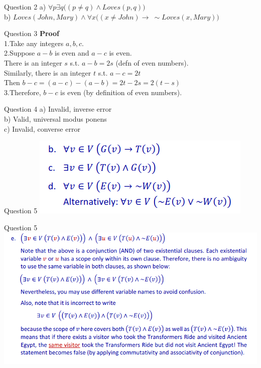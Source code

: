 \documentclass[10pt]{beamer}
\begin{document}
\begin{frame}[fragile]{Question 2}
a) $\forall p \exists q \Big((p \neq q) \land Loves(p, q)\Big)$ \\
b) $Loves(John, Mary) \land \forall x \Big((x \neq John) \rightarrow \ \sim Loves(x, Mary)\Big)$
\end{frame}

\begin{frame}[fragile]{Question 3}
\textbf{Proof}\\
1.Take any integers $a, b, c$.\\
2.Suppose $a-b$ is even and $a- c$ is even. \\
 There is an integer $s$ s.t. $a - b = 2s$ (defn of even numbers). \\
 Similarly, there is an integer $t$ s.t. $a-c = 2t$ \\
 Then $b - c = (a - c) - (a - b) = 2t - 2s = 2 (t-s)$\\
3.Therefore, $b-c$ is even (by definition of even numbers).\\
\end{frame}

\begin{frame}[fragile]{Question 4}
a) Invalid, inverse error \\
b) Valid, universal modus ponens \\
c) Invalid, converse error \\
\end{frame}

\begin{frame}[fragile]{Question 5}
\includegraphics[width=\textwidth]{5bcd.png}
\end{frame}

\begin{frame}[fragile]{Question 5}
\includegraphics[width=\textwidth]{5e.png}
\end{frame}
\end{document}
